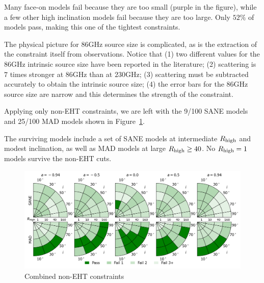 Many face-on models fail because they are too small (purple in the figure), while a few other high inclination models fail because they are too large.  Only $52\%$ of models pass, making this one of the tightest constraints.

The physical picture for 86GHz source size is complicated, as is the extraction of the constraint itself from observations.  Notice that (1) two different values for the 86GHz intrinsic source size have been reported in the literature; (2) scattering is $7$ times stronger at $86$GHz than at $230$GHz; (3) scattering must be subtracted accurately to obtain the intrinsic source size; (4) the error bars for the 86GHz source size are narrow and this determines the strength of the constraint.



Applying only non-EHT constraints, we are left with the 9/100 SANE models and 25/100 MAD models shown in Figure~\ref{fig:non_eht_cuts}.

The surviving models include a set of SANE models at intermediate $R_\mathrm{high}$ and modest inclination, as well as MAD models at large $R_\mathrm{high} \ge 40$. No $R_\mathrm{high} = 1$ models survive the non-EHT cuts.

\begin{figure}
  \centering
  \includegraphics[width=\textwidth]{./figures/Non_Interferometric_Constraints.png}
  \caption{Combined non-EHT constraints}
  \label{fig:non_eht_cuts}
\end{figure}

